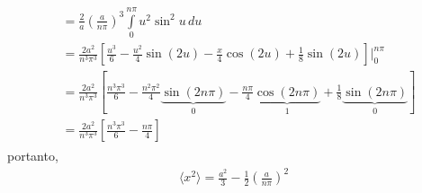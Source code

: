 \begin{prob}
\begin{sol}
\begin{align}
\begin{split}
															&= \frac{2}{a}\left(\frac{a}{n \pi}\right)^{3}\int\limits_{0}^{n \pi}u^{2}\sin^{2}u\,d{u}\\
															&= \frac{2a^{2}}{n^{3} \pi^{3}}\left[\frac{u^{3}}{6}-\frac{u^{2}}{4}\sin{(2u)}-\frac{x}{4}\cos{(2u)}+\frac{1}{8}\sin{(2u)}\right]\Bigg|_{0}^{n \pi}\\
															&= \frac{2a^{2}}{n^{3} \pi^{3}}\left[\frac{n^{3} \pi^{3}}{6}-\frac{n^{2} \pi^{2}}{4}\underbrace{\sin(2n \pi)}_{\displaystyle 0}-\frac{n \pi}{4}\underbrace{\cos{(2n \pi)}}_{\displaystyle 1}+\frac{1}{8}\underbrace{\sin{(2n \pi)}}_{\displaystyle 0}\right]\\
															&= \frac{2a^{2}}{n^{3} \pi^{3}}\left[\frac{n^{3} \pi^{3}}{6}-\frac{n \pi}{4}\right]
			\end{split}
		\end{align}
		portanto,
		\begin{align}
			\boxed{
				\langle x^{2} \rangle = \frac{a^{2}}{3}-\frac{1}{2}\left(\frac{a}{n \pi}\right)^{2}
			}
		\end{align}


\end{sol}
\end{prob}
